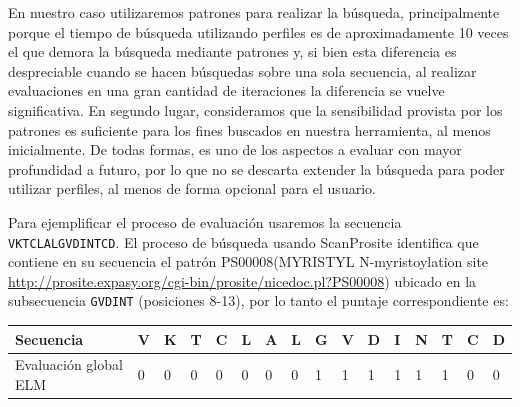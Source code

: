 En nuestro caso utilizaremos patrones para realizar la búsqueda, principalmente porque el tiempo de búsqueda utilizando perfiles es de aproximadamente 10 veces el que demora la búsqueda mediante patrones 
y, si bien esta diferencia es despreciable cuando se hacen búsquedas sobre una sola secuencia, al realizar evaluaciones en una gran cantidad de iteraciones la diferencia se vuelve significativa.
En segundo lugar, consideramos que la sensibilidad provista por los patrones es suficiente para los fines buscados en nuestra herramienta, al menos inicialmente.
De todas formas, es uno de los aspectos a evaluar con mayor profundidad a futuro, por lo que no se descarta extender la búsqueda para poder utilizar perfiles, al menos de forma opcional para el usuario. 

Para ejemplificar el proceso de evaluación usaremos la secuencia \texttt{VKTCLALGVDINTCD}. El proceso de búsqueda usando ScanProsite identifica que contiene en su secuencia el patrón PS00008(MYRISTYL N-myristoylation site 
\url{http://prosite.expasy.org/cgi-bin/prosite/nicedoc.pl?PS00008}) ubicado en la subsecuencia \texttt{GVDINT} (posiciones 8-13), por lo tanto el puntaje correspondiente es:

\vspace{0.5cm}
\begin{tabular}{llllllllllllllll} 
\hline
Secuencia & \textbf{V} & \textbf{K} & \textbf{T} & \textbf{C} & \textbf{L} & \textbf{A} & \textbf{L} & \textbf{G} & \textbf{V} & \textbf{D} & \textbf{I} & \textbf{N} & \textbf{T} & \textbf{C} & \textbf{D}\\ \hline
Evaluación global ELM & 0 & 0 & 0 & 0 & 0 & 0 & 0 & 1 & 1 & 1 & 1 & 1 & 1 & 0 & 0 \\ \hline
\end{tabular}














